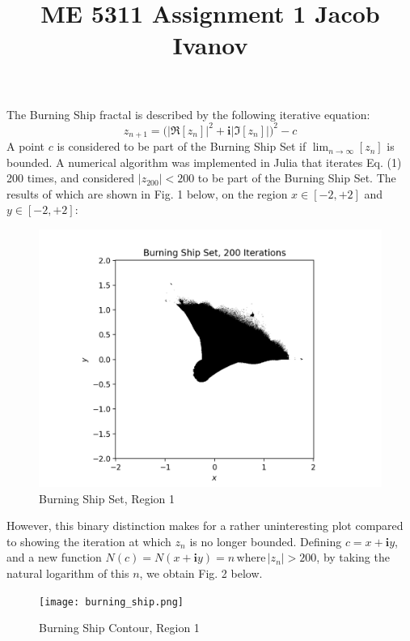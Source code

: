 \documentclass[10pt, reqno]{amsart}
\begin{document}
\title{ME 5311 \quad Assignment 1 \quad Jacob Ivanov}

\maketitle

\begin{multicols}{2}
The Burning Ship fractal is described by the following iterative equation:
\begin{equation}
    z_{n + 1} = \Big( |\Re[z_n]|^2 + \mathbf{i} |\Im[z_n]| \Big)^2 - c
\end{equation}
A point $c$ is considered to be part of the Burning Ship Set if $\lim_{n \to \infty} [z_n]$ is bounded. A numerical algorithm was implemented in Julia that iterates Eq. (1) 200 times, and considered $|z_{200}| < 200$ to be part of the Burning Ship Set. The results of which are shown in Fig. 1 below, on the region $x \in [-2, +2]$ and $y \in [-2, +2]$:

\begin{figure}[H]
    \centering
    \includegraphics[width=1\linewidth]{burning_ship_set.png}
    \caption{Burning Ship Set, Region 1}
    \label{fig:1}
\end{figure}

However, this binary distinction makes for a rather uninteresting plot compared to showing the iteration at which $z_n$ is no longer bounded. Defining $c = x + \mathbf{i}y$, and a new function $N(c) = N(x + \mathbf{i}y) = n \, \mathrm{where} \, |z_n| > 200$, by taking the natural logarithm of this $n$, we obtain Fig. 2 below. 
\begin{figure}[H]
    \centering
    \texttt{[image: burning\_ship.png]}
    \caption{Burning Ship Contour, Region 1}
    \label{fig:2}
\end{figure}


\end{multicols}
\end{document}
